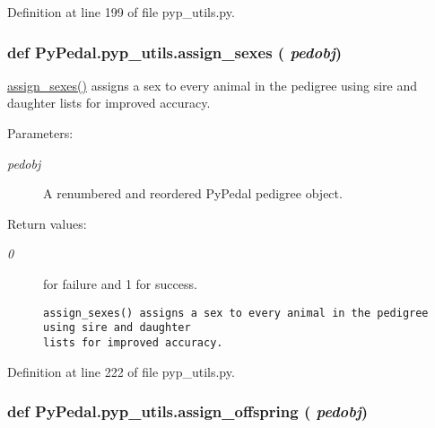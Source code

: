 Definition at line 199 of file pyp\_\-utils.py.\hypertarget{namespacePyPedal_1_1pyp__utils_908a3b69336ce99ac8061998f4bba00f}{
\subsubsection[assign\_\-sexes]{\setlength{\rightskip}{0pt plus 5cm}def Py\-Pedal.pyp\_\-utils.assign\_\-sexes ( {\em pedobj})}}
\label{namespacePyPedal_1_1pyp__utils_908a3b69336ce99ac8061998f4bba00f}


\hyperlink{namespacePyPedal_1_1pyp__utils_908a3b69336ce99ac8061998f4bba00f}{assign\_\-sexes()} assigns a sex to every animal in the pedigree using sire and daughter lists for improved accuracy. 

\begin{Desc}
\item[Parameters:]
\begin{description}
\item[{\em pedobj}]A renumbered and reordered Py\-Pedal pedigree object. \end{description}
\end{Desc}
\begin{Desc}
\item[Return values:]
\begin{description}
\item[{\em 0}]for failure and 1 for success.

\footnotesize\begin{verbatim}assign_sexes() assigns a sex to every animal in the pedigree using sire and daughter
lists for improved accuracy.
\end{verbatim}
\normalsize
 \end{description}
\end{Desc}


Definition at line 222 of file pyp\_\-utils.py.\hypertarget{namespacePyPedal_1_1pyp__utils_c7e563808824c6680acff02146552cc4}{
\subsubsection[assign\_\-offspring]{\setlength{\rightskip}{0pt plus 5cm}def Py\-Pedal.pyp\_\-utils.assign\_\-offspring ( {\em pedobj})}}
\label{namespacePyPedal_1_1pyp__utils_c7e563808824c6680acff02146552cc4}


